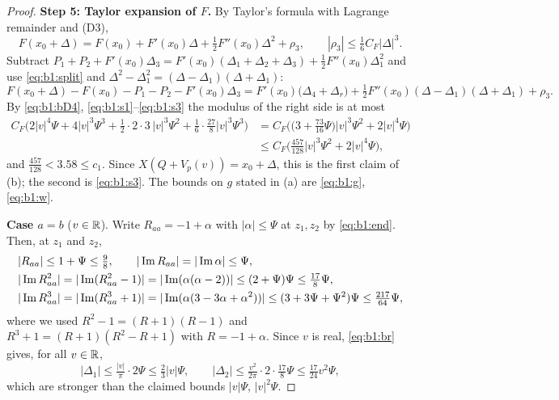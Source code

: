 \begin{proof}
\medskip\noindent\textbf{Step 5: Taylor expansion of $F$.} By Taylor's formula with Lagrange remainder and \textup{(D3)},
\[
F(x_0+\Delta)=F(x_0)+F'(x_0)\Delta+\tfrac12F''(x_0)\Delta^2+\rho_3,\qquad|\rho_3|\le\tfrac16C_F|\Delta|^3 .
\]
Subtract $P_1+P_2+F'(x_0)\Delta_3=F'(x_0)(\Delta_1+\Delta_2+\Delta_3)+\frac12F''(x_0)\Delta_1^2$ and use \eqref{eq:b1:split} and $\Delta^2-\Delta_1^2=(\Delta-\Delta_1)(\Delta+\Delta_1)$:
\begin{equation}\label{eq:b1:err}
F(x_0+\Delta)-F(x_0)-P_1-P_2-F'(x_0)\Delta_3=F'(x_0)\big(\Delta_4+\Delta_r\big)+\tfrac12F''(x_0)(\Delta-\Delta_1)(\Delta+\Delta_1)+\rho_3 .
\end{equation}
By \eqref{eq:b1:bD4}, \eqref{eq:b1:s1}--\eqref{eq:b1:s3} the modulus of the right side is at most
\begin{align*}
C_F\Big(2|v|^4\Psi+4|v|^3\Psi^3+\tfrac12\cdot2\cdot3\,|v|^3\Psi^2+\tfrac16\cdot\tfrac{27}8|v|^3\Psi^3\Big)
&=C_F\Big(\big(3+\tfrac{73}{16}\Psi\big)|v|^3\Psi^2+2|v|^4\Psi\Big)\\
&\le C_F\Big(\tfrac{457}{128}|v|^3\Psi^2+2|v|^4\Psi\Big),
\end{align*}
and $\frac{457}{128}<3.58\le c_1$. Since $X(Q+V_p(v))=x_0+\Delta$, this is the first claim of (b); the second is \eqref{eq:b1:s3}.
The bounds on $g$ stated in (a) are \eqref{eq:b1:g}, \eqref{eq:b1:w}.

\medskip\noindent\textbf{Case $a=b$} ($v\in\mathbb{R}$). Write $R_{aa}=-1+\alpha$ with $|\alpha|\le\Psi$ at $z_1,z_2$ by \eqref{eq:b1:end}. Then, at $z_1$ and $z_2$,
\begin{equation}\label{eq:b1:diag0}
\begin{aligned}
&|R_{aa}|\le1+\Psi\le\tfrac98,\qquad|\operatorname{Im} R_{aa}|=|\operatorname{Im}\alpha|\le\Psi,\\
&|\operatorname{Im} R_{aa}^2|=|\operatorname{Im}(R_{aa}^2-1)|=|\operatorname{Im}(\alpha(\alpha-2))|\le(2+\Psi)\Psi\le\tfrac{17}8\Psi,\\
&|\operatorname{Im} R_{aa}^3|=|\operatorname{Im}(R_{aa}^3+1)|=|\operatorname{Im}(\alpha(3-3\alpha+\alpha^2))|\le(3+3\Psi+\Psi^2)\Psi\le\tfrac{217}{64}\Psi ,
\end{aligned}
\end{equation}
where we used $R^2-1=(R+1)(R-1)$ and $R^3+1=(R+1)(R^2-R+1)$ with $R=-1+\alpha$. Since $v$ is real, \eqref{eq:b1:br} gives, for all $v\in\mathbb{R}$,
\begin{equation}\label{eq:b1:diag1}
|\Delta_1|\le\tfrac{|v|}\pi\cdot2\Psi\le\tfrac23|v|\Psi,\qquad|\Delta_2|\le\tfrac{v^2}{2\pi}\cdot2\cdot\tfrac{17}8\Psi\le\tfrac{17}{24}v^2\Psi ,
\end{equation}
which are stronger than the claimed bounds $|v|\Psi$, $|v|^2\Psi$.


\end{proof}
